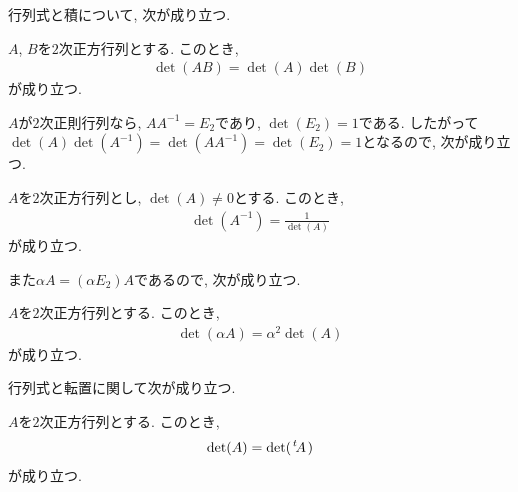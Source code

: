 行列式と積について,
次が成り立つ.
\begin{theorem}
  \label{thm:det:hom}
  $A$, $B$を$2$次正方行列とする.
  このとき,
  \begin{align*}
   \det(AB)=\det(A)\det(B)
  \end{align*}
  が成り立つ.
\end{theorem}

$A$が$2$次正則行列なら, $AA^{-1}=E_2$であり, $\det(E_2)=1$である.
したがって$\det(A)\det(A^{-1})=\det(AA^{-1})=\det(E_2)=1$となるので,
次が成り立つ.
\begin{cor}
  $A$を$2$次正方行列とし, $\det(A)\neq 0$とする.
  このとき,
  \begin{align*}
   \det(A^{-1})=\frac{1}{\det(A)}
  \end{align*}
  が成り立つ.  
\end{cor}

また$\alpha A=(\alpha E_2) A$であるので, 次が成り立つ.
\begin{cor}
  \label{thm:det:scalar}
  $A$を$2$次正方行列とする.
  このとき,
  \begin{align*}
   \det(\alpha A)=\alpha^2 \det(A)
  \end{align*}
  が成り立つ.  
\end{cor}



行列式と転置に関して次が成り立つ.
\begin{theorem}
  \label{thm:det:transpose}
  $A$を$2$次正方行列とする.
  このとき,
  \begin{align*}
   \det(A)=\det({\left.^{t}\!A\right.})
  \end{align*}
  が成り立つ.  
\end{theorem}


